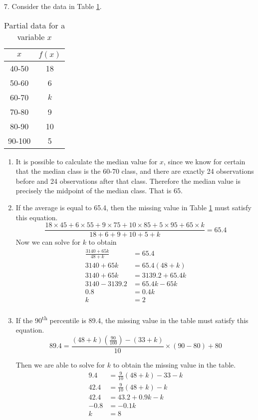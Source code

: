\documentclass[fleqn]{article}
\begin{document}
\begin{answers}
	\item[7.]
	Consider the data in Table \ref{q7}.
	\begin{table}[htb]
		\centering
		\begin{tabular}{||c|c||}
			\hline
			\(x\) & \(f(x)\) \\
			\hline
			40-50 & 18 \\
			50-60 & 6 \\
			60-70 & \(k\) \\
			70-80 & 9 \\
			80-90 & 10 \\
			90-100 & 5 \\
			\hline
		\end{tabular}
		\caption{Partial data for a variable \(x\)}
		\label{q7}
	\end{table}
	\begin{enumerate}
		\item %
		It is possible to calculate the median value for \(x\), since we know for certain that the median class is the 60-70 class, and there are exactly 24 observations before and 24 observations after that class. Therefore the median value is precisely the midpoint of the median class. That is 65.

		\item %
		If the average is equal to 65.4, then the missing value in Table \ref{q7} must satisfy this equation.
		\[\frac{18 \times 45 + 6 \times 55 + 9 \times 75 + 10 \times 85 + 5 \times 95 + 65 \times k}{18 + 6 + 9 + 10 + 5 + k} = 65.4\]
		Now we can solve for \(k\) to obtain
		\begin{align*}
			\frac{3140 + 65k}{48 + k} &= 65.4 \\
			3140 + 65k &= 65.4(48 + k) \\
			3140 + 65k &= 3139.2 + 65.4k \\
			3140 - 3139.2 &= 65.4k - 65k \\
			0.8 &= 0.4k \\
			k &= 2 \\
		\end{align*}

		\item %
		If the 90\textsuperscript{th} percentile is 89.4, the missing value in the table must satisfy this equation.
		\[89.4 = \frac{(48 + k)\left(\frac{90}{100}\right) - (33 + k)}{10} \times (90 - 80) + 80\]

		Then we are able to solve for \(k\) to obtain the missing value in the table.
		\begin{align*}
			9.4 &= \frac{9}{10}(48 + k) - 33 - k \\
			42.4 &= \frac{9}{10}(48 + k) - k \\
			42.4 &= 43.2 + 0.9k - k \\
			-0.8 &= - 0.1k \\
			k &= 8 \\
		\end{align*}
	\end{enumerate}


\end{answers}
\end{document}
